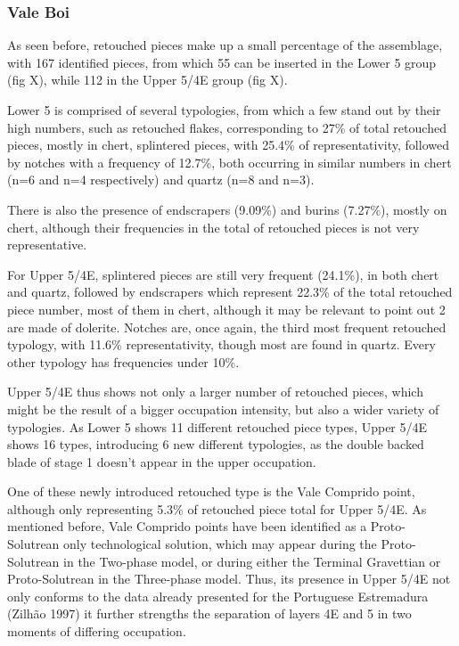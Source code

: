 \documentclass[12pt,twoside]{reedthesis}
\begin{document}
\hypertarget{vale-boi-7}{%
\subsubsection{Vale Boi}\label{vale-boi-7}}

As seen before, retouched pieces make up a small percentage of the assemblage, with 167 identified pieces, from which 55 can be inserted in the Lower 5 group (fig X), while 112 in the Upper 5/4E group (fig X).

Lower 5 is comprised of several typologies, from which a few stand out by their high numbers, such as retouched flakes, corresponding to 27\% of total retouched pieces, mostly in chert, splintered pieces, with 25.4\% of representativity, followed by notches with a frequency of 12.7\%, both occurring in similar numbers in chert (n=6 and n=4 respectively) and quartz (n=8 and n=3).

There is also the presence of endscrapers (9.09\%) and burins (7.27\%), mostly on chert, although their frequencies in the total of retouched pieces is not very representative.

For Upper 5/4E, splintered pieces are still very frequent (24.1\%), in both chert and quartz, followed by endscrapers which represent 22.3\% of the total retouched piece number, most of them in chert, although it may be relevant to point out 2 are made of dolerite. Notches are, once again, the third most frequent retouched typology, with 11.6\% representativity, though most are found in quartz. Every other typology has frequencies under 10\%.

Upper 5/4E thus shows not only a larger number of retouched pieces, which might be the result of a bigger occupation intensity, but also a wider variety of typologies. As Lower 5 shows 11 different retouched piece types, Upper 5/4E shows 16 types, introducing 6 new different typologies, as the double backed blade of stage 1 doesn't appear in the upper occupation.

One of these newly introduced retouched type is the Vale Comprido point, although only representing 5.3\% of retouched piece total for Upper 5/4E. As mentioned before, Vale Comprido points have been identified as a Proto-Solutrean only technological solution, which may appear during the Proto-Solutrean in the Two-phase model, or during either the Terminal Gravettian or Proto-Solutrean in the Three-phase model. Thus, its presence in Upper 5/4E not only conforms to the data already presented for the Portuguese Estremadura (Zilhão 1997) it further strengths the separation of layers 4E and 5 in two moments of differing occupation.
\end{document}
